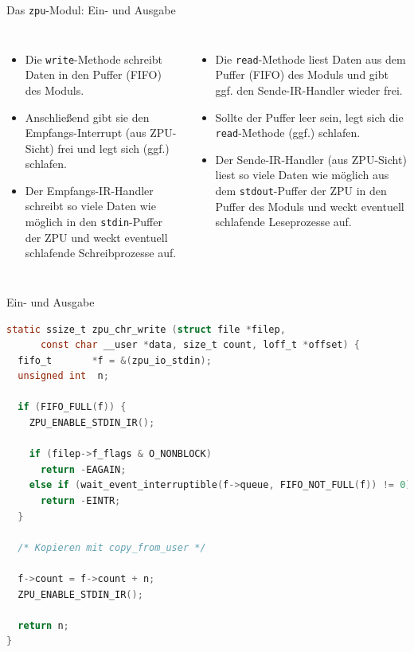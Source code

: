 \documentclass[10pt]{beamer}
\begin{document}
	\begin{frame}{Das \texttt{zpu}-Modul: Ein- und Ausgabe}
	\begin{columns}
		\begin{itemize}
			\item Die \texttt{write}-Methode schreibt Daten in den Puffer (FIFO) des Moduls.
			\item Anschließend gibt sie den Empfangs-Interrupt (aus ZPU-Sicht) frei und legt sich (ggf.) schlafen.
			\item Der Empfangs-IR-Handler schreibt so viele Daten wie möglich in den \texttt{stdin}-Puffer der ZPU und weckt eventuell schlafende Schreibprozesse auf.
		\end{itemize}
		\begin{itemize}
			\item Die \texttt{read}-Methode liest Daten aus dem Puffer (FIFO) des Moduls und gibt ggf. den Sende-IR-Handler wieder frei.
			\item Sollte der Puffer leer sein, legt sich die \texttt{read}-Methode (ggf.) schlafen.
			\item Der Sende-IR-Handler (aus ZPU-Sicht) liest so viele Daten wie möglich aus dem \texttt{stdout}-Puffer der ZPU in den Puffer des Moduls und weckt eventuell schlafende Leseprozesse auf.
		\end{itemize}
	\end{columns}
	\end{frame}
	
	\begin{frame}[fragile]{Ein- und Ausgabe}
	\begin{lstlisting}[language=C,basicstyle=\footnotesize\ttfamily]
	static ssize_t zpu_chr_write (struct file *filep,
	  const char __user *data, size_t count, loff_t *offset) {
  fifo_t       *f = &(zpu_io_stdin);
  unsigned int  n;

  if (FIFO_FULL(f)) {
    ZPU_ENABLE_STDIN_IR();

    if (filep->f_flags & O_NONBLOCK)
      return -EAGAIN;
    else if (wait_event_interruptible(f->queue, FIFO_NOT_FULL(f)) != 0)
      return -EINTR;
  }

  /* Kopieren mit copy_from_user */

  f->count = f->count + n;
  ZPU_ENABLE_STDIN_IR();

  return n;
}
	\end{lstlisting}
	\end{frame}
	
\end{document}

